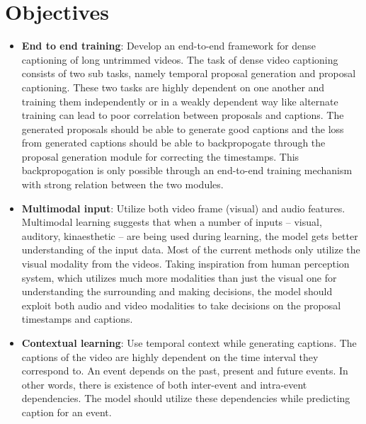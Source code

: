 \section{Objectives}

\par %

\begin{itemize}
	\item \textbf{End to end training}: Develop an end-to-end framework for dense captioning of long untrimmed videos. The task of dense video captioning consists of two sub tasks, namely temporal proposal generation and proposal captioning. These two tasks are highly dependent on one another and training them independently or in a weakly dependent way like alternate training can lead to poor correlation between proposals and captions. The generated proposals should be able to generate good captions and the loss from generated captions should be able to backpropogate through the proposal generation module for correcting the timestamps. This backpropogation is only possible through an end-to-end training mechanism with strong relation between the two modules.
	\item \textbf{Multimodal input}: Utilize both video frame (visual) and audio features. Multimodal learning suggests that when a number of inputs – visual, auditory, kinaesthetic – are being used during learning, the model gets better understanding of the input data. Most of the current methods only utilize the visual modality from the videos. Taking inspiration from human perception system, which utilizes much more modalities than just the visual one for understanding the surrounding and making decisions, the model should exploit both audio and video modalities to take decisions on the proposal timestamps and captions.
	\item \textbf{Contextual learning}: Use temporal context while generating captions. The captions of the video are highly dependent on the time interval they correspond to. An event depends on the past, present and future events. In other words, there is existence of both inter-event and intra-event dependencies. The model should utilize these dependencies while predicting caption for an event.
\end{itemize}